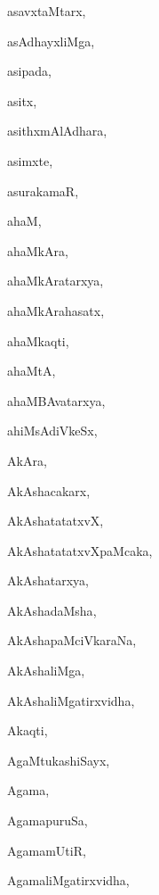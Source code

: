 \begin{multicols}{3}
{\noindent
{asavxtaMtarx}, \pageref{asavxtaMtarx}

\noindent
{asAdhayxliMga}, \pageref{asAdhayxliMga}

\noindent
{asipada}, \pageref{asipada}

\noindent
{asitx}, \pageref{asitx}

\noindent
{asithxmAlAdhara}, \pageref{asithxmAlAdhara}

\noindent
{asimxte}, \pageref{asimxte}

\noindent
{asurakamaR}, \pageref{asurakamaR}

\noindent
{ahaM}, \pageref{ahaM}

\noindent
{ahaMkAra}, \pageref{ahaMkAra}

\noindent
{ahaMkAratarxya}, \pageref{ahaMkAratarxya}

\noindent
{ahaMkArahasatx}, \pageref{ahaMkArahasatx}

\noindent
{ahaMkaqti}, \pageref{ahaMkaqti}

\noindent
{ahaMtA}, \pageref{ahaMtA}

\noindent
{ahaMBAvatarxya}, \pageref{ahaMBAvatarxya}

\noindent
{ahiMsAdiVkeSx}, \pageref{ahiMsAdiVkeSx}

\noindent
{AkAra}, \pageref{AkAra}

\noindent
{AkAshacakarx}, \pageref{AkAshacakarx}

\noindent
{AkAshatatatxvX}, \pageref{AkAshatatatxvX}

\noindent
{AkAshatatatxvXpaMcaka}, \pageref{AkAshatatatxvXpaMcaka}

\noindent
{AkAshatarxya}, \pageref{AkAshatarxya}

\noindent
{AkAshadaMsha}, \pageref{AkAshadaMsha}

\noindent
{AkAshapaMciVkaraNa}, \pageref{AkAshapaMciVkaraNa}

\noindent
{AkAshaliMga}, \pageref{AkAshaliMga}

\noindent
{AkAshaliMgatirxvidha}, \pageref{AkAshaliMgatirxvidha}

\noindent
{Akaqti}, \pageref{Akaqti}

\noindent
{AgaMtukashiSayx}, \pageref{AgaMtukashiSayx}

\noindent
{Agama}, \pageref{Agama}

\noindent
{AgamapuruSa}, \pageref{AgamapuruSa}

\noindent
{AgamamUtiR}, \pageref{AgamamUtiR}

\noindent
{AgamaliMgatirxvidha}, \pageref{AgamaliMgatirxvidha}

}
\end{multicols}
